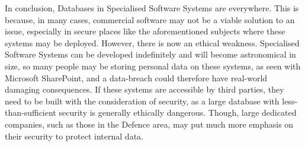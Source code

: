 \documentclass[landscape,a0paper,fontscale=0.3]{baposter}
\begin{document}
\begin{poster}
{In conclusion, Databases in Specialised Software Systems are everywhere. This is because, in many cases, commercial software may not be a viable solution to an issue, especially in secure places like the aforementioned subjects where these systems may be deployed. However, there is now an ethical weakness. Specialised Software Systems can be developed indefinitely and will become astronomical in size, so many people may be storing personal data on these systems, as seen with Microsoft SharePoint, and a data-breach could therefore have real-world damaging consequences. If these systems are accessible by third parties, they need to be built with the consideration of security, as a large database with less-than-sufficient security is generally ethically dangerous. Though, large dedicated companies, such as those in the Defence area, may put much more emphasis on their security to protect internal data. \cite{meyers2002software}

\begin{center}
\end{center}}
\end{poster}
\end{document}

